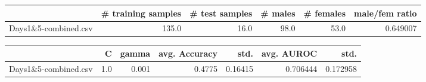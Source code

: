 \begin{tabular}{lrrrrr}
\hline
{} &  \# training samples &  \# test samples &  \# males &  \# females &  male/fem ratio \\
\hline
Days1\&5-combined.csv &               135.0 &            16.0 &     98.0 &       53.0 &        0.649007 \\
\hline
\end{tabular}
\begin{tabular}{lrrrrrr}
\hline
{} &    C &  gamma &  avg. Accuracy &     std. &  avg. AUROC &      std. \\
\hline
Days1\&5-combined.csv &  1.0 &  0.001 &         0.4775 &  0.16415 &    0.706444 &  0.172958 \\
\hline
\end{tabular}
